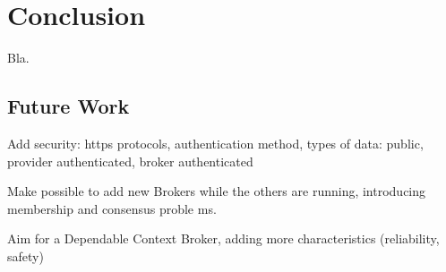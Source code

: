 \chapter{Conclusion}
\label{chap:conclusion}
Bla.

\section{Future Work}
Add security: https protocols, authentication method, types of data: public, provider authenticated, broker authenticated

Make possible to add new Brokers while the others are running, introducing membership and consensus proble ms.

Aim for a Dependable Context Broker, adding more characteristics (reliability, safety)